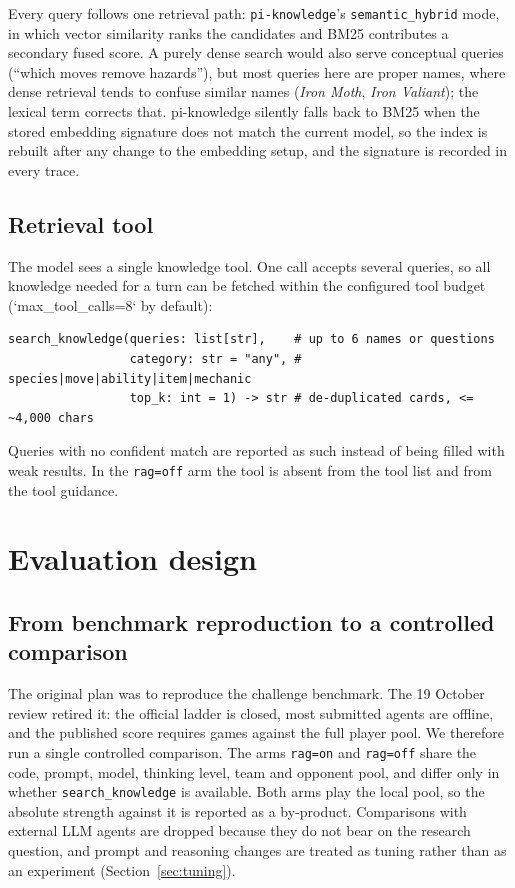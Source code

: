 \documentclass[11pt,a4paper]{article}
\newcommand{\code}[1]{\texttt{#1}}
\begin{document}
Every query follows one retrieval path: \code{pi-knowledge}'s \code{semantic\_hybrid} mode, in which vector
similarity ranks the candidates and BM25 contributes a secondary fused score. A purely dense search would also
serve conceptual queries (``which moves remove hazards''), but most queries here are proper names, where dense
retrieval tends to confuse similar names (\emph{Iron Moth}, \emph{Iron Valiant}); the lexical term corrects
that. pi-knowledge silently falls back to BM25 when the stored embedding signature does not match the
current model, so the index is rebuilt after any change to the embedding setup, and the signature is recorded
in every trace.

\subsection{Retrieval tool}
The model sees a single knowledge tool. One call accepts several queries, so all knowledge needed for a turn
can be fetched within the configured tool budget (`max\_tool\_calls=8` by default):

{\small
\begin{verbatim}
search_knowledge(queries: list[str],    # up to 6 names or questions
                 category: str = "any", # species|move|ability|item|mechanic
                 top_k: int = 1) -> str # de-duplicated cards, <= ~4,000 chars
\end{verbatim}
}

\noindent
Queries with no confident match are reported as such instead of being filled with weak results. In the
\code{rag=off} arm the tool is absent from the tool list and from the tool guidance.

\section{Evaluation design}
\label{sec:eval}

\subsection{From benchmark reproduction to a controlled comparison}
The original plan was to reproduce the challenge benchmark. The 19 October review retired it: the official
ladder is closed, most submitted agents are offline, and the published score requires games against the full
player pool. We therefore run a single controlled comparison. The arms \code{rag=on} and \code{rag=off} share
the code, prompt, model, thinking level, team and opponent pool, and differ only in whether
\code{search\_knowledge} is available. Both arms play the local pool, so the absolute strength against it is
reported as a by-product. Comparisons with external LLM agents are dropped because they do not bear on the
research question, and prompt and reasoning changes are treated as tuning rather than as an experiment
(Section~\ref{sec:tuning}).
\end{document}
